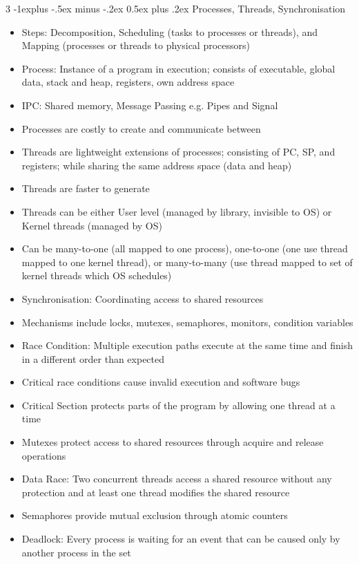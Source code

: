 \documentclass[10pt, landscape]{article}
\makeatletter
\renewcommand{\section}{\@startsection{section}{1}{0mm}%
                                {-1ex plus -.5ex minus -.2ex}%
                                {0.5ex plus .2ex}%
                                {\normalfont\large\bfseries}}
\renewcommand{\section}{\@startsection{section}{2}{0mm}%
                                {-1explus -.5ex minus -.2ex}%
                                {0.5ex plus .2ex}%
                                {\normalfont\normalsize\bfseries}}
\makeatother
\begin{document}
\begin{multicols*}{3}
\section{Processes, Threads, Synchronisation}
\begin{itemize}
    \item Steps: Decomposition, Scheduling (tasks to processes or threads), and Mapping (processes or threads to physical processors)
    \item Process: Instance of a program in execution; consists of executable, global data, stack and heap, registers, own address space
    \item IPC: Shared memory, Message Passing e.g. Pipes and Signal
    \item Processes are costly to create and communicate between
    \item Threads are lightweight extensions of processes; consisting of PC, SP, and registers; while sharing the same address space (data and heap)
    \item Threads are faster to generate
    \item Threads can be either User level (managed by library, invisible to OS) or Kernel threads (managed by OS)
    \item Can be many-to-one (all mapped to one process), one-to-one (one use thread mapped to one kernel thread), or many-to-many (use thread mapped to set of kernel threads which OS schedules)
    \item Synchronisation: Coordinating access to shared resources
    \item Mechanisms include locks, mutexes, semaphores, monitors, condition variables
    \item Race Condition: Multiple execution paths execute at the same time and finish in a different order than expected
    \item Critical race conditions cause invalid execution and software bugs
    \item Critical Section protects parts of the program by allowing one thread at a time
    \item Mutexes protect access to shared resources through acquire and release operations
    \item Data Race: Two concurrent threads access a shared resource without any protection and at least one thread modifies the shared resource
    \item Semaphores provide mutual exclusion through atomic counters
    \item Deadlock: Every process is waiting for an event that can be caused only by another process in the set

\end{itemize}
\end{multicols*}
\end{document}
